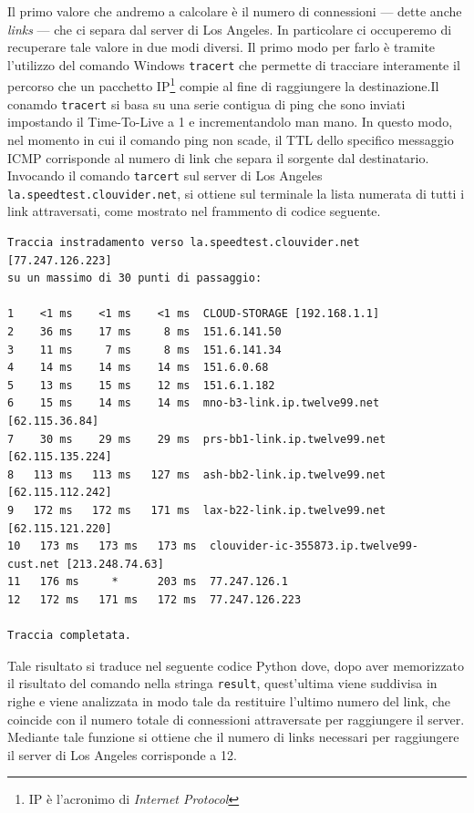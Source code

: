 Il primo valore che andremo a calcolare è il numero di connessioni — dette anche \textsl{links} — che ci separa dal server di Los Angeles. In particolare ci occuperemo di recuperare tale valore in due modi diversi. Il primo modo per farlo è tramite l'utilizzo del comando Windows \texttt{tracert} che permette di tracciare interamente il percorso che un pacchetto IP\footnote{IP è l'acronimo di \textsl{Internet Protocol}} compie al fine di raggiungere la destinazione.Il conamdo \texttt{tracert} si basa su una serie contigua di ping che sono inviati impostando il Time-To-Live a 1 e incrementandolo man mano. In questo modo, nel momento in cui il comando ping non scade, il TTL dello specifico messaggio ICMP corrisponde al numero di link che separa il sorgente dal destinatario. Invocando il comando \texttt{tarcert} sul server di Los Angeles \texttt{la.speedtest.clouvider.net}, si ottiene sul terminale la lista numerata di tutti i link attraversati, come mostrato nel frammento di codice seguente. 

\begin{lstlisting}[style = bash]
Traccia instradamento verso la.speedtest.clouvider.net [77.247.126.223]
su un massimo di 30 punti di passaggio:

1    <1 ms    <1 ms    <1 ms  CLOUD-STORAGE [192.168.1.1] 
2    36 ms    17 ms     8 ms  151.6.141.50 
3    11 ms     7 ms     8 ms  151.6.141.34 
4    14 ms    14 ms    14 ms  151.6.0.68 
5    13 ms    15 ms    12 ms  151.6.1.182 
6    15 ms    14 ms    14 ms  mno-b3-link.ip.twelve99.net [62.115.36.84] 
7    30 ms    29 ms    29 ms  prs-bb1-link.ip.twelve99.net [62.115.135.224] 
8   113 ms   113 ms   127 ms  ash-bb2-link.ip.twelve99.net [62.115.112.242] 
9   172 ms   172 ms   171 ms  lax-b22-link.ip.twelve99.net [62.115.121.220] 
10   173 ms   173 ms   173 ms  clouvider-ic-355873.ip.twelve99-cust.net [213.248.74.63] 
11   176 ms     *      203 ms  77.247.126.1 
12   172 ms   171 ms   172 ms  77.247.126.223 

Traccia completata.
\end{lstlisting}

\noindent Tale risultato si traduce nel seguente codice Python dove, dopo aver memorizzato il risultato del comando nella stringa \texttt{result}, quest'ultima viene suddivisa in righe e viene analizzata in modo tale da restituire l'ultimo numero del link, che coincide con il numero totale di connessioni attraversate per raggiungere il server. Mediante tale funzione si ottiene che il numero di links necessari per raggiungere il server di Los Angeles corrisponde a 12.

